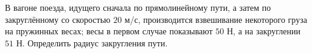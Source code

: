В вагоне поезда, идущего сначала по прямолинейному пути,
а затем по закруглённому со скоростью $20$ м/с,
производится взвешивание некоторого груза на пружинных весах;
весы в первом случае показывают $50$ Н, а на закруглении $51$ Н.
Определить радиус закругления пути.
